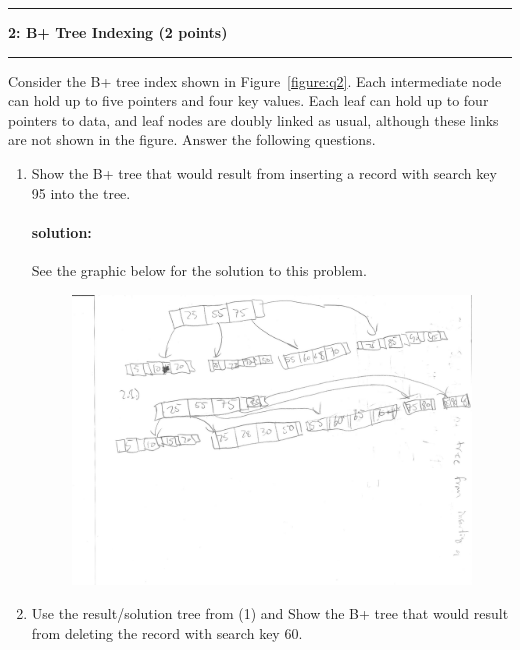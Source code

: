 \documentclass[11pt]{article}
\newcommand\question[2]{\vspace{.25in}\hrule\textbf{#1: #2}\vspace{.5em}\hrule\vspace{.10in}}
\begin{document}
\question{2}{B+ Tree Indexing (2 points)}
Consider the B+ tree index shown in Figure~\ref{figure:q2}. 
Each intermediate node can hold up to five pointers and four key values. Each leaf can hold up to four pointers to data, and leaf nodes are doubly linked as usual, although these links are not shown in the figure.
Answer the following questions.\\

\begin{enumerate}
	\item Show the B+ tree that would result from inserting a record with search key 95 into the tree.
	\paragraph{solution:} \hfill \break
	See the graphic below for the solution to this problem.\\
	\begin{figure}
		\includegraphics[width=\textwidth]{twoPointOne.png}
  \end{figure}
	\item Use the result/solution tree from (1) and Show the B+ tree that would result from deleting the record with search key 60.

\end{enumerate}
\end{document}
